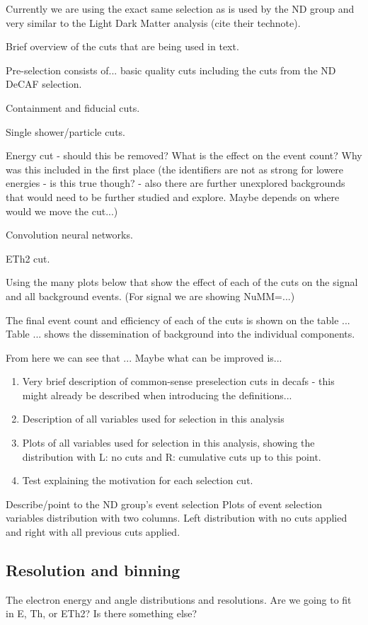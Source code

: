 \documentclass[12pt]{article}
\begin{document}
Currently we are using the exact same selection as is used by the ND group \cite{NOVA-doc-56383} and very similar to the Light Dark Matter analysis (cite their technote).

Brief overview of the cuts that are being used in text.

Pre-selection consists of... basic quality cuts including the cuts from the ND DeCAF selection.

Containment and fiducial cuts.

Single shower/particle cuts.

Energy cut - should this be removed? What is the effect on the event count? Why was this included in the first place (the identifiers are not as strong for lowere energies - is this true though? - also there are further unexplored backgrounds that would need to be further studied and explore. Maybe depends on where would we move the cut...)

Convolution neural networks.

ETh2 cut.

Using the many plots below that show the effect of each of the cuts on the signal and all background events. (For signal we are showing NuMM=...)

The final event count and efficiency of each of the cuts is shown on the table ... Table ... shows the dissemination of background into the individual components.

From here we can see that ... Maybe what can be improved is...

\begin{enumerate}
\item Very brief description of common-sense preselection cuts in decafs - this might already be described when introducing the definitions...
\item Description of all variables used for selection in this analysis
\item Plots of all variables used for selection in this analysis, showing the distribution with L: no cuts and R: cumulative cuts up to this point.
\item Test explaining the motivation for each selection cut.
\end{enumerate}
Describe/point to the ND group's event selection
Plots of event selection variables distribution with two columns. Left distribution with no cuts applied and right with all previous cuts applied.

\subsection{Resolution and binning}
The electron energy and angle distributions and resolutions. Are we going to fit in E, Th, or ETh2? Is there something else?
\end{document}
